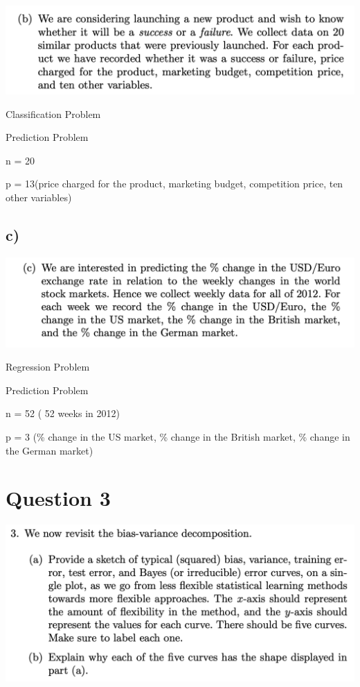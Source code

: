 \documentclass[
]{article}
\begin{document}
\includegraphics{images/image-1328812267.png}

Classification Problem

Prediction Problem

n = 20

p = 13(price charged for the product, marketing budget, competition
price, ten other variables)

\hypertarget{c-1}{%
\subsection{c)}\label{c-1}}

\includegraphics{images/image-827378815.png}

Regression Problem

Prediction Problem

n = 52 ( 52 weeks in 2012)

p = 3 (\% change in the US market, \% change in the British market, \%
change in the German market)

\hypertarget{question-3}{%
\section{Question 3}\label{question-3}}

\includegraphics{images/image-997866889.png}
\end{document}
